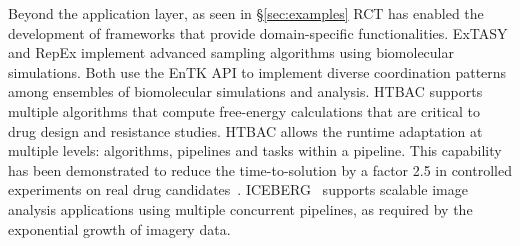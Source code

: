 \documentclass[preprint,12pt, a4paper]{elsarticle}
\begin{document}



Beyond the application layer, as seen in 
\S\ref{sec:examples} RCT has enabled
the development of frameworks that provide domain-specific functionalities.
ExTASY and RepEx implement advanced sampling algorithms using biomolecular
simulations. Both use the EnTK API to implement diverse coordination patterns
among ensembles of biomolecular simulations and analysis. HTBAC supports
multiple algorithms that compute free-energy calculations that are critical to
drug design and resistance studies. HTBAC allows the runtime adaptation at
multiple levels: algorithms, pipelines and tasks within a pipeline. This
capability has been demonstrated to reduce the time-to-solution by a factor 2.5
in controlled experiments on real drug candidates~\citep{dakka2018concurrent}.
ICEBERG~\cite{paraskevakos2019workflow} supports scalable image analysis
applications using multiple concurrent pipelines, as required by the exponential
growth of imagery data.
\end{document}
